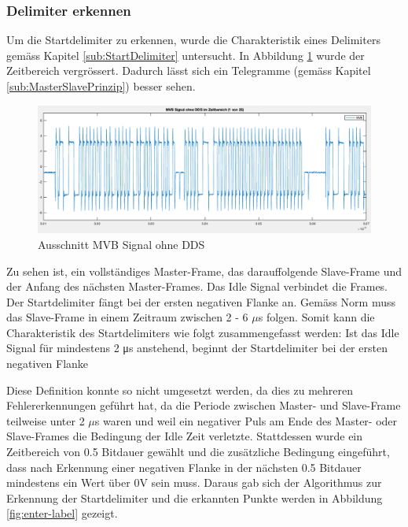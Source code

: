 \subsubsection{Delimiter erkennen}
Um die Startdelimiter zu erkennen, wurde die Charakteristik eines Delimiters gemäss Kapitel \ref{sub:StartDelimiter} untersucht. In Abbildung \ref{fig:AusschnittMvbOhneDds} wurde der Zeitbereich vergrössert. Dadurch lässt sich ein Telegramme (gemäss Kapitel \ref{sub:MasterSlavePrinzip}) besser sehen.

\begin{figure}[H]
    \centering
    \includegraphics[width=0.8\linewidth]{Figures/Chap3/Busauslastung/Ausschnitt_MVB_ohne_Delimiter.png}
    \caption{Ausschnitt MVB Signal ohne DDS}
    \label{fig:AusschnittMvbOhneDds}
\end{figure}

Zu sehen ist, ein vollständiges Master-Frame, das darauffolgende Slave-Frame und der Anfang des nächsten Master-Frames. Das Idle Signal verbindet die Frames. Der Startdelimiter fängt bei der ersten negativen Flanke an. Gemäss Norm muss das Slave-Frame in einem Zeitraum zwischen 2 - 6 $\mu$s folgen. Somit kann die Charakteristik des Startdelimiters wie folgt zusammengefasst werden: Ist das Idle Signal für mindestens 2 μs anstehend, beginnt der Startdelimiter bei der ersten negativen Flanke

Diese Definition konnte so nicht umgesetzt werden, da dies zu mehreren Fehlererkennungen geführt hat, da die Periode zwischen Master- und Slave-Frame teilweise unter 2 $\mu$s waren und weil ein negativer Puls am Ende des Master- oder Slave-Frames die Bedingung der Idle Zeit verletzte. Stattdessen wurde ein Zeitbereich von 0.5 Bitdauer gewählt und die zusätzliche Bedingung eingeführt, dass nach Erkennung einer negativen Flanke in der nächsten 0.5 Bitdauer mindestens ein Wert über 0V sein muss. Daraus gab sich der Algorithmus zur Erkennung der Startdelimiter und die erkannten Punkte werden in Abbildung \ref{fig:enter-label} gezeigt.


